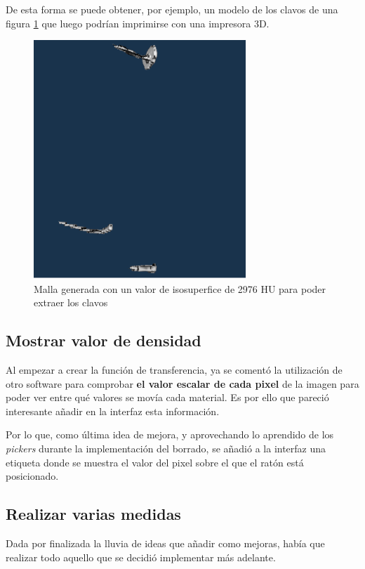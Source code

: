 De esta forma se puede obtener, por ejemplo, un modelo de los clavos de una figura \ref{fig:malla_clavos} que luego podrían imprimirse con una impresora 3D.

\begin{figure}[H]
	\centering
	\includegraphics[width=8cm]{imagenes/malla_clavos}
	\caption{Malla generada con un valor de isosuperfice de 2976 HU para poder extraer los clavos}
	\label{fig:malla_clavos}
\end{figure}

\subsection{Mostrar valor de densidad}

Al empezar a crear la función de transferencia, ya se comentó la utilización de otro software para comprobar \textbf{el valor escalar de cada pixel} de la imagen para poder ver entre qué valores se movía cada material. Es por ello que pareció interesante añadir en la interfaz esta información.

Por lo que, como última idea de mejora, y aprovechando lo aprendido de los \textit{pickers} durante la implementación del borrado, se añadió a la interfaz una etiqueta donde se muestra el valor del pixel sobre el que el ratón está posicionado.

\subsection{Realizar varias medidas}

Dada por finalizada la lluvia de ideas que añadir como mejoras, había que realizar todo aquello que se decidió implementar más adelante.

